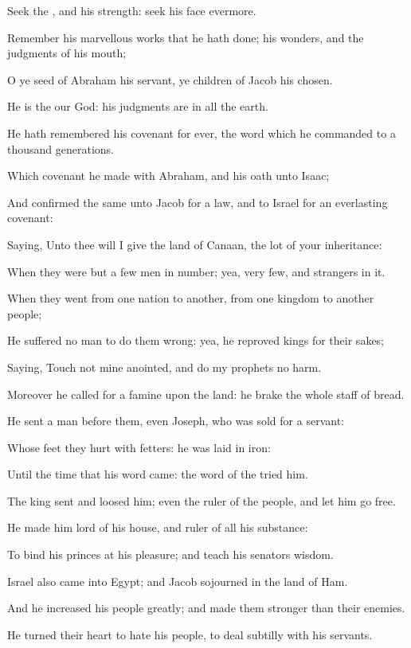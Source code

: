 \verse Seek the \LORD, and his strength: seek his face evermore.

\verse Remember his marvellous works that he hath done; his wonders, and the judgments of his mouth;

\verse O ye seed of Abraham his servant, ye children of Jacob his chosen.

\verse He is the \LORD our God: his judgments are in all the earth.

\verse He hath remembered his covenant for ever, the word which he commanded to a thousand generations.

\verse Which covenant he made with Abraham, and his oath unto Isaac;

\verse And confirmed the same unto Jacob for a law, and to Israel for an everlasting covenant:

\verse Saying, Unto thee will I give the land of Canaan, the lot of your inheritance:

\verse When they were but a few men in number; yea, very few, and strangers in it.

\verse When they went from one nation to another, from one kingdom to another people;

\verse He suffered no man to do them wrong: yea, he reproved kings for their sakes;

\verse Saying, Touch not mine anointed, and do my prophets no harm.

\verse Moreover he called for a famine upon the land: he brake the whole staff of bread.

\verse He sent a man before them, even Joseph, who was sold for a servant:

\verse Whose feet they hurt with fetters: he was laid in iron:

\verse Until the time that his word came: the word of the \LORD tried him.

\verse The king sent and loosed him; even the ruler of the people, and let him go free.

\verse He made him lord of his house, and ruler of all his substance:

\verse To bind his princes at his pleasure; and teach his senators wisdom.

\verse Israel also came into Egypt; and Jacob sojourned in the land of Ham.

\verse And he increased his people greatly; and made them stronger than their enemies.

\verse He turned their heart to hate his people, to deal subtilly with his servants.

